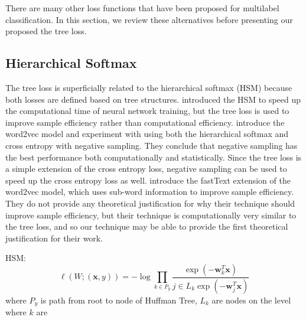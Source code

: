 \documentclass[twoside]{article}
\theoremstyle{definition}
\newcommand{\trans}[1]{{#1}^{T}}
\newcommand{\w}{\mathbf w}
\newcommand{\x}{\mathbf x}
\newcommand{\fixme}[1]{\noindent{\color{red}\textbf{FIXME:}  {#1}}}
\begin{document}
There are many other loss functions that have been proposed for multilabel classification.
In this section, we review these alternatives before presenting our proposed the tree loss.

\subsection{Hierarchical Softmax}

The tree loss is superficially related to the hierarchical softmax (HSM) because both losses are defined based on tree structures.
\cite{morin2005hierarchical} introduced the HSM to speed up the computational time of neural network training,
but the tree loss is used to improve sample efficiency rather than computational efficiency.
\cite{mikolov2013distributed} introduce the word2vec model and experiment with using both the hierarchical softmax and cross entropy with negative sampling.
They conclude that negative sampling has the best performance both computationally and statistically.
Since the tree loss is a simple extension of the cross entropy loss,
negative sampling can be used to speed up the cross entropy loss as well.
\cite{bojanowski2017enriching} introduce the fastText extension of the word2vec model, which uses sub-word information to improve sample efficiency.
They do not provide any theoretical justification for why their technique should improve sample efficiency,
but their technique is computationally very similar to the tree loss,
and so our technique may be able to provide the first theoretical justification for their work.

HSM:
\begin{equation}
    \label{eq:xentropy}
    \ell(W;(\x,y)) = - \log \prod_{k\in P_y}\frac {\exp(-\trans\w_k \x)}{j\in L_k \exp(-\trans \w_j \x)}
\end{equation}
where $P_y$ is path from root to node of Huffman Tree,
$L_k$ are nodes on the level where $k$ are



\end{document}
